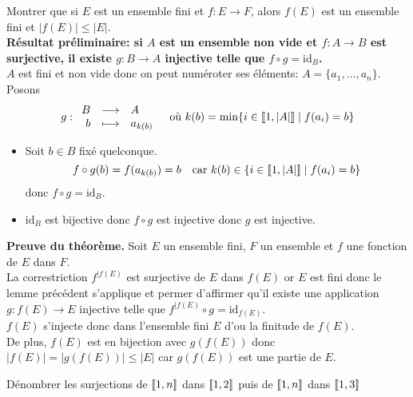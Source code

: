 \documentclass{article}
\begin{document}
\begin{question_kholle}{Montrer que si $E$ est un ensemble fini et $f:E\longrightarrow F$, alors $f(E)$ est un ensemble fini et $|f(E)|\leq |E|$.}
	\hfill\\
	\textbf{Résultat préliminaire: si $A$ est un ensemble non vide et $f:A\longrightarrow B$ est surjective, il existe $g:B\longrightarrow A$ injective telle que $f\circ g=\mathrm{id}_{B}$.}\\
	$A$ est fini et non vide donc on peut numéroter ses éléments: $A=\{a_{1},\dots,a_{n}\}$. Posons
	\[
		g:\begin{array}{rcl} B & \longrightarrow & A \\ b & \longmapsto & a_{k(b)} \end{array} \quad\text{où $k(b)=\min\{i\in[\![ 1,|A| ]\!] \mid f(a_{i})=b\}$}
	\]
	\begin{itemize}
		\item Soit $b\in B$ fixé quelconque.
		      \[
			      f\circ g(b)=f(a_{k(b)}) = b \quad\text{car } k(b)\in\{i\in[\![ 1,|A| ]\!]\mid f(a_{i})=b\}
		      \]
		      donc $f\circ g=\mathrm{id}_{B}$.
		\item $\mathrm{id}_{B}$ est bijective donc $f\circ g$ est injective donc $g$ est injective.
	\end{itemize}

	\vspace{2em}

	\noindent\textbf{Preuve du théorème.}
	Soit $E$ un ensemble fini, $F$ un ensemble et $f$ une fonction de $E$ dans $F$.\\
	La correstriction $f^{|f(E)}$ est surjective de $E$ dans $f(E)$ or $E$ est fini donc le lemme précédent s’applique et permer d’affirmer qu’il existe une application $g:f(E)\longrightarrow E$ injective telle que $f^{|f(E)}\circ g = \mathrm{id}_{f(E)}$.\\
	$f(E)$ s’injecte donc dans l’ensemble fini $E$ d’ou la finitude de $f(E)$.\\
	De plus, $f(E)$ est en bijection avec $g(f(E))$ donc $|f(E)|=|g(f(E))|\leq |E|$ car $g(f(E))$ est une partie de $E$.

\end{question_kholle}

\begin{question_kholle}{Dénombrer les surjections de $[\![ 1,n ]\!]$ dans $[\![ 1,2 ]\!]$ puis de $[\![ 1,n ]\!]$ dans $[\![ 1,3 ]\!]$}

\end{question_kholle}
\end{document}
